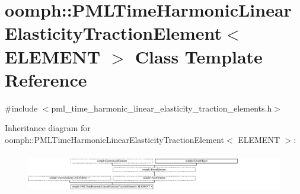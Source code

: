 \hypertarget{classoomph_1_1PMLTimeHarmonicLinearElasticityTractionElement}{}\section{oomph\+:\+:P\+M\+L\+Time\+Harmonic\+Linear\+Elasticity\+Traction\+Element$<$ E\+L\+E\+M\+E\+NT $>$ Class Template Reference}
\label{classoomph_1_1PMLTimeHarmonicLinearElasticityTractionElement}


{\ttfamily \#include $<$pml\+\_\+time\+\_\+harmonic\+\_\+linear\+\_\+elasticity\+\_\+traction\+\_\+elements.\+h$>$}

Inheritance diagram for oomph\+:\+:P\+M\+L\+Time\+Harmonic\+Linear\+Elasticity\+Traction\+Element$<$ E\+L\+E\+M\+E\+NT $>$\+:\begin{figure}[H]
\begin{center}
\leavevmode
\includegraphics[height=1.748634cm]{classoomph_1_1PMLTimeHarmonicLinearElasticityTractionElement}
\end{center}
\end{figure}
